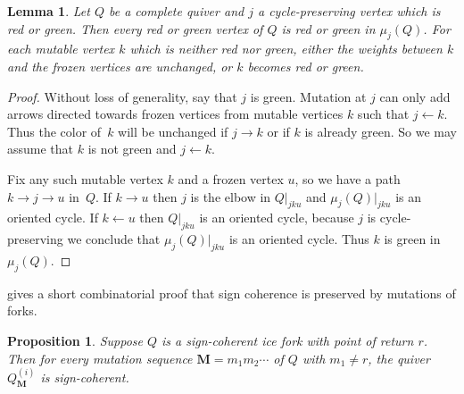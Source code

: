 \documentclass[12pt]{amsart}
\newtheorem{prop}[thm]{Proposition}
\newtheorem{lem}[thm]{Lemma}
\theoremstyle{definition}
\theoremstyle{remark}
\numberwithin{equation}{section}
\begin{document}
\begin{lem}
\label{lem: skip colored}
Let $Q$ be a complete quiver and $j$ a cycle-preserving vertex which is red or green. %
Then every red or green vertex of $Q$ is red or green in $\mu_j(Q)$. 
For each mutable vertex $k$ which is neither red nor green, either the weights between $k$ and the frozen vertices are unchanged, or $k$ becomes red or green.
\end{lem}

\begin{proof}
Without loss of generality, say that $j$ is green.
Mutation at $j$ can only add arrows directed towards frozen vertices from mutable vertices $k$ such that $j \leftarrow k$.
Thus the color of~$k$ will be unchanged if $j \rightarrow k$ or if $k$ is already green.
So we may assume that $k$ is not green and $j \leftarrow k$.

Fix any such mutable vertex $k$ and a frozen vertex $u$, so we have a path $k \rightarrow j \rightarrow u$ in~$Q$. 
If $k \rightarrow u$ then $j$ is the elbow in $Q|_{jku}$ and $\mu_j(Q)|_{jku}$ is an oriented cycle.
If $k \leftarrow u$ then $Q|_{jku}$ is an oriented cycle, because $j$ is cycle-preserving we conclude that $\mu_j(Q)|_{jku}$ is an oriented cycle.
Thus $k$ is green in $\mu_j(Q)$.
\end{proof}

 gives a short combinatorial proof that sign coherence is preserved by mutations of forks.

\begin{prop}
Suppose $Q$ is a sign-coherent ice fork with point of return $r$.
Then for every mutation sequence $\mathbf M = m_1 m_2 \cdots$ of $Q$ with $m_1 \neq r$, the quiver $Q^{(i)}_{\mathbf M}$ is sign-coherent.
\end{prop}
\end{document}
